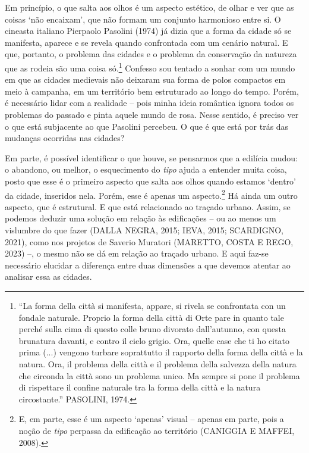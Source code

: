\documentclass[]{report}
\begin{document}
	Em princípio, o que salta aos olhos é um aspecto estético, de olhar e ver que as coisas `não encaixam', que não formam um conjunto harmonioso entre si. O cineasta italiano Pierpaolo Pasolini (1974) já dizia que a forma da cidade só se manifesta, aparece e se revela quando confrontada com um cenário natural. E que, portanto, o problema das cidades e o problema da conservação da natureza que as rodeia são uma coisa só.\footnote[4]{“La forma della città si manifesta, appare, si rivela se confrontata con un fondale naturale. Proprio la forma della città di Orte pare in quanto tale perché sulla cima di questo colle bruno divorato dall’autunno, con questa brunatura davanti, e contro il cielo grigio. Ora, quelle case che ti ho citato prima (...) vengono turbare soprattutto il rapporto della forma della città e la natura. Ora, il problema della città e il problema della salvezza della natura che circonda la città sono un problema unico. Ma sempre si pone il problema di rispettare il confine naturale tra la forma della città e la natura circostante.” PASOLINI, 1974.} Confesso sou tentado a sonhar com um mundo em que as cidades medievais não deixaram sua forma de polos compactos em meio à campanha, em um território bem estruturado ao longo do tempo. Porém, é necessário lidar com a realidade – pois minha ideia romântica ignora todos os problemas do passado e pinta aquele mundo de rosa.  Nesse sentido, é preciso ver o que está subjacente ao que Pasolini percebeu. O que é que está por trás das mudanças ocorridas nas cidades? 
	
	Em parte, é possível identificar o que houve, se pensarmos que a edilícia mudou: o abandono, ou melhor, o esquecimento do \textit{tipo} ajuda a entender muita coisa, posto que esse é o primeiro aspecto que salta aos olhos quando estamos `dentro' da cidade, inseridos nela. Porém, esse é apenas um aspecto.\footnote[5]{E, em parte, esse é um aspecto `apenas' visual – apenas em parte, pois a noção de \textit{tipo} perpassa da edificação ao território (CANIGGIA E MAFFEI, 2008). } Há ainda um outro aspecto, que é estrutural. E que está relacionado ao traçado urbano. Assim, se podemos deduzir uma solução em relação às edificações – ou ao menos um vislumbre do que fazer (DALLA NEGRA, 2015; IEVA, 2015; SCARDIGNO, 2021), como nos projetos de Saverio Muratori (MARETTO, COSTA E REGO, 2023) –, o mesmo não se dá em relação ao traçado urbano. E aqui faz-se necessário elucidar a diferença entre duas dimensões a que devemos atentar ao analisar essa as cidades. 
	
\end{document}
